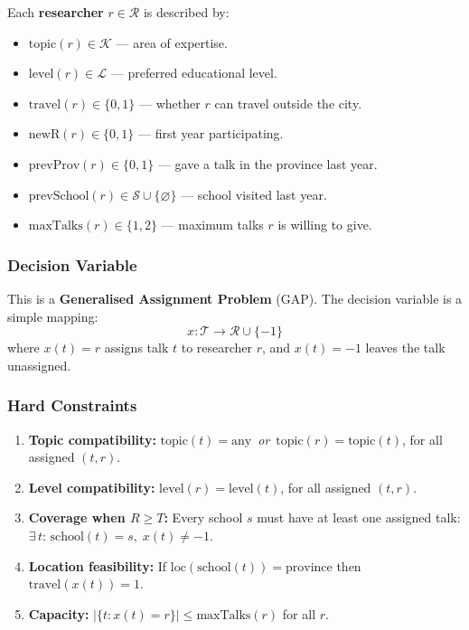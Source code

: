 \documentclass[12pt, a4paper]{article}
\begin{document}
Each \textbf{researcher} $r \in \mathcal{R}$ is described by:
\begin{itemize}[itemsep=0.1em]
  \item $\text{topic}(r) \in \mathcal{K}$ — area of expertise.
  \item $\text{level}(r) \in \mathcal{L}$ — preferred educational level.
  \item $\text{travel}(r) \in \{0,1\}$ — whether $r$ can travel outside the city.
  \item $\text{newR}(r) \in \{0,1\}$ — first year participating.
  \item $\text{prevProv}(r) \in \{0,1\}$ — gave a talk in the province last year.
  \item $\text{prevSchool}(r) \in \mathcal{S} \cup \{\varnothing\}$ — school visited last year.
  \item $\text{maxTalks}(r) \in \{1, 2\}$ — maximum talks $r$ is willing to give.
\end{itemize}

\subsubsection{Decision Variable}

This is a \textbf{Generalised Assignment Problem} (GAP). The decision variable
is a simple mapping:
\begin{equation}
  x : \mathcal{T} \to \mathcal{R} \cup \{-1\}
\end{equation}
where $x(t) = r$ assigns talk $t$ to researcher $r$, and $x(t) = -1$ leaves the
talk unassigned.

\subsubsection{Hard Constraints}

\begin{enumerate}[label=\textbf{HC\arabic*.}, leftmargin=3em, itemsep=0.3em]
  \item \textbf{Topic compatibility:} $\text{topic}(t) = \text{any}$ \,\textit{or}\,
        $\text{topic}(r) = \text{topic}(t)$, for all assigned $(t, r)$.
  \item \textbf{Level compatibility:} $\text{level}(r) = \text{level}(t)$, for all
        assigned $(t, r)$.
  \item \textbf{Coverage when $R \geq T$:} Every school $s$ must have at least one
        assigned talk: $\exists\, t\!:\,\text{school}(t)=s,\;x(t)\neq -1$.
  \item \textbf{Location feasibility:} If $\text{loc}(\text{school}(t)) = \text{province}$
        then $\text{travel}(x(t)) = 1$.
  \item \textbf{Capacity:} $|\{t : x(t) = r\}| \leq \text{maxTalks}(r)$ for all $r$.
\end{enumerate}
\end{document}
